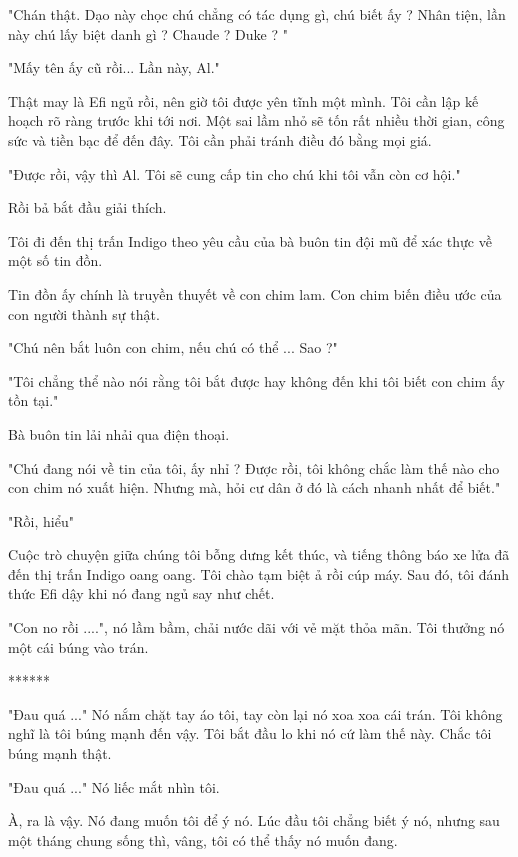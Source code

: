 "Chán thật. Dạo này chọc chú chẳng có tác dụng gì, chú biết ấy ? Nhân tiện, lần này chú lấy biệt danh gì ? Chaude ? Duke ? "

"Mấy tên ấy cũ rồi... Lần này, Al."

Thật may là Efi ngủ rồi, nên giờ tôi được yên tĩnh một mình. Tôi cần lập kế hoạch rõ ràng trước khi tới nơi. Một sai lầm nhỏ sẽ tốn rất nhiều thời gian, công sức và tiền bạc để đến đây. Tôi cần phải tránh điều đó bằng mọi giá.

"Được rồi, vậy thì Al. Tôi sẽ cung cấp tin cho chú khi tôi vẫn còn cơ hội."

Rồi bả bắt đầu giải thích. 

Tôi đi đến thị trấn Indigo theo yêu cầu của bà buôn tin đội mũ để xác thực về một số tin đồn. 

Tin đồn ấy chính là truyền thuyết về con chim lam. Con chim biến điều ước của con người thành sự thật.
 
"Chú nên bắt luôn con chim, nếu chú có thể ... Sao ?"

"Tôi chẳng thể nào nói rằng tôi bắt được hay không đến khi tôi biết con chim ấy tồn tại."

Bà buôn tin lải nhải qua điện thoại.

"Chú đang nói về tin của tôi, ấy nhỉ ? Được rồi, tôi không chắc làm thế nào cho con chim nó xuất hiện. Nhưng mà, hỏi cư dân ở đó là cách nhanh nhất để biết."

"Rồi, hiểu"

Cuộc trò chuyện giữa chúng tôi bỗng dưng kết thúc, và tiếng thông báo xe lửa đã đến thị trấn Indigo oang oang. Tôi chào tạm biệt ả rồi cúp máy. Sau đó, tôi đánh thức Efi dậy khi nó đang ngủ say như chết. 

"Con no rồi ....", nó lầm bầm, chải nước dãi với vẻ mặt thỏa mãn. Tôi thưởng nó một cái búng vào trán. \\


\begin{center}
	******
\end{center}



"Đau quá ..." Nó nắm chặt tay áo tôi, tay còn lại nó xoa xoa cái trán. 
Tôi không nghĩ là tôi búng mạnh đến vậy. Tôi bắt đầu lo khi nó cứ làm thế này. Chắc tôi búng mạnh thật. 

"Đau quá ..." Nó liếc mắt nhìn tôi.

À, ra là vậy. Nó đang muốn tôi để ý nó. Lúc đầu tôi chẳng biết ý nó, nhưng sau một tháng chung sống thì, vâng, tôi có thể thấy nó muốn đang.

